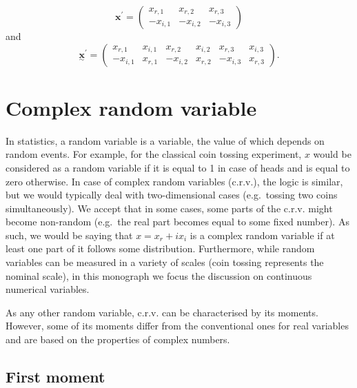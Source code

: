 \documentclass[
]{book}
\begin{document}
\begin{equation}
    {\mathbf{x}}^{\prime} = \begin{pmatrix} x_{r,1} & x_{r,2} & x_{r,3} \\
                                         -x_{i,1} & -x_{i,2} & -x_{i,3}
                        \end{pmatrix} 
    \label{eq:complexVectorMatrixTransposedConj}
\end{equation}
and
\begin{equation}
    \underset{\sim}{\mathbf{x}}^{\prime} = \begin{pmatrix} x_{r,1} & x_{i,1} & x_{r,2} & x_{i,2} & x_{r,3} & x_{i,3} \\
                                        -x_{i,1} & x_{r,1} & -x_{i,2} & x_{r,2} & -x_{i,3} & x_{r,3}
                        \end{pmatrix} .
    \label{eq:complexMatrixTransposedConj}
\end{equation}

\hypertarget{complexRandomVariable}{%
\section{Complex random variable}\label{complexRandomVariable}}

In statistics, a random variable is a variable, the value of which depends on random events. For example, for the classical coin tossing experiment, \(x\) would be considered as a random variable if it is equal to 1 in case of heads and is equal to zero otherwise. In case of complex random variables (c.r.v.), the logic is similar, but we would typically deal with two-dimensional cases (e.g.~tossing two coins simultaneously). We accept that in some cases, some parts of the c.r.v. might become non-random (e.g.~the real part becomes equal to some fixed number). As such, we would be saying that \(x=x_r+ix_i\) is a complex random variable if at least one part of it follows some distribution. Furthermore, while random variables can be measured in a variety of scales (coin tossing represents the nominal scale), in this monograph we focus the discussion on continuous numerical variables.

As any other random variable, c.r.v. can be characterised by its moments. However, some of its moments differ from the conventional ones for real variables and are based on the properties of complex numbers.

\hypertarget{first-moment}{%
\subsection{First moment}\label{first-moment}}
\end{document}
